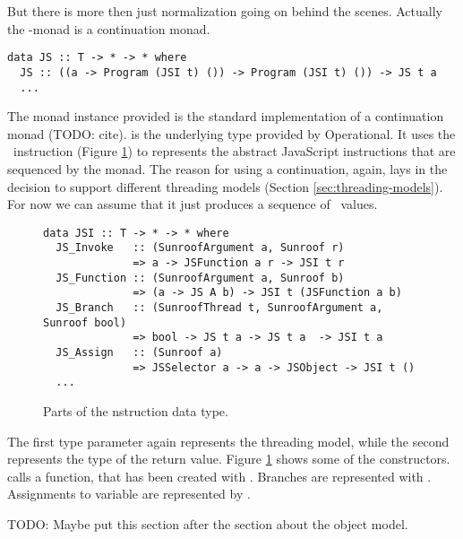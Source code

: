 But there is more then just normalization going on behind the scenes. 
Actually the \JS-monad is a continuation monad.
\begin{verbatim}
data JS :: T -> * -> * where
  JS :: ((a -> Program (JSI t) ()) -> Program (JSI t) ()) -> JS t a
  ...
\end{verbatim}
The monad instance provided is the standard implementation of 
a continuation monad (TODO: cite).
 is the underlying type provided by Operational.
It uses the \JSI~instruction (Figure \ref{fig:jsi-definition}) 
to represents the abstract JavaScript instructions
that are sequenced by the monad. The reason for using a
continuation, again, lays in the decision to support different
threading models (Section \ref{sec:threading-models}).
For now we can assume that it just produces a sequence of \JSI~values.
\begin{figure}
\begin{verbatim}
data JSI :: T -> * -> * where
  JS_Invoke   :: (SunroofArgument a, Sunroof r) 
              => a -> JSFunction a r -> JSI t r
  JS_Function :: (SunroofArgument a, Sunroof b) 
              => (a -> JS A b) -> JSI t (JSFunction a b)
  JS_Branch   :: (SunroofThread t, SunroofArgument a, Sunroof bool) 
              => bool -> JS t a -> JS t a  -> JSI t a
  JS_Assign   :: (Sunroof a) 
              => JSSelector a -> a -> JSObject -> JSI t ()
  ...
\end{verbatim}
\caption{Parts of the \JSI nstruction data type.}
\label{fig:jsi-definition}
\end{figure}
The first type parameter again represents the threading model, while
the second represents the type of the return value. 
Figure \ref{fig:jsi-definition} shows some of the constructors.
 calls a function, that has been created with .
Branches are represented with . Assignments to variable
are represented by .

TODO: Maybe put this section after the section about the object model.

